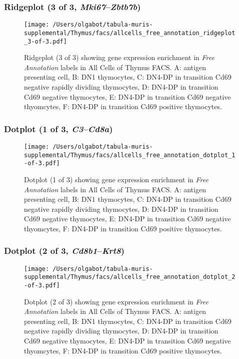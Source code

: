 \clearpage

\subsubsection{Ridgeplot (3 of 3, \emph{Mki67}--\emph{Zbtb7b})}
\begin{figure}[h]
\centering
\texttt{[image: /Users/olgabot/tabula-muris-supplemental/Thymus/facs/allcells\_free\_annotation\_ridgeplot\_3-of-3.pdf]}

\caption{ Ridgeplot (3 of 3)  showing gene expression enrichment in \emph{Free Annotation} labels in All Cells of Thymus FACS. A: antigen presenting cell, B: DN1 thymocytes, C: DN4-DP in transition Cd69 negative rapidly dividing thymocytes, D: DN4-DP in transition Cd69 negative thymocytes, E: DN4-DP in transition Cd69 negative thyomcytes, F: DN4-DP in transition Cd69 positive thymocytes.}
\end{figure}


\clearpage

\subsubsection{Dotplot (1 of 3, \emph{C3}--\emph{Cd8a})}
\begin{figure}[h]
\centering
\texttt{[image: /Users/olgabot/tabula-muris-supplemental/Thymus/facs/allcells\_free\_annotation\_dotplot\_1-of-3.pdf]}

\caption{ Dotplot (1 of 3)  showing gene expression enrichment in \emph{Free Annotation} labels in All Cells of Thymus FACS. A: antigen presenting cell, B: DN1 thymocytes, C: DN4-DP in transition Cd69 negative rapidly dividing thymocytes, D: DN4-DP in transition Cd69 negative thymocytes, E: DN4-DP in transition Cd69 negative thyomcytes, F: DN4-DP in transition Cd69 positive thymocytes.}
\end{figure}


\clearpage

\subsubsection{Dotplot (2 of 3, \emph{Cd8b1}--\emph{Krt8})}
\begin{figure}[h]
\centering
\texttt{[image: /Users/olgabot/tabula-muris-supplemental/Thymus/facs/allcells\_free\_annotation\_dotplot\_2-of-3.pdf]}

\caption{ Dotplot (2 of 3)  showing gene expression enrichment in \emph{Free Annotation} labels in All Cells of Thymus FACS. A: antigen presenting cell, B: DN1 thymocytes, C: DN4-DP in transition Cd69 negative rapidly dividing thymocytes, D: DN4-DP in transition Cd69 negative thymocytes, E: DN4-DP in transition Cd69 negative thyomcytes, F: DN4-DP in transition Cd69 positive thymocytes.}
\end{figure}


